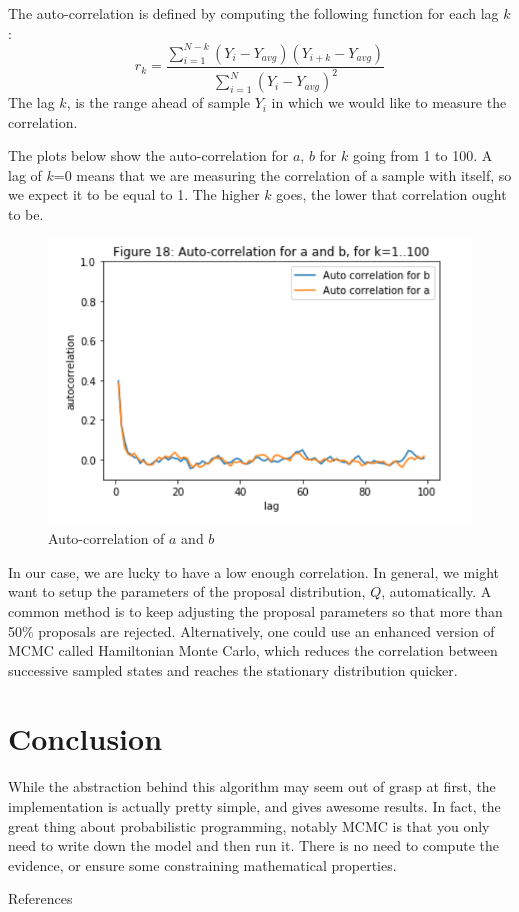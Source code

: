 The auto-correlation is defined by computing the following function for each lag $k$:
\begin{equation}r_{k}=\frac{\sum_{i=1}^{N-k}\left(Y_{i}-Y_{a v g}\right)\left(Y_{i+k}-Y_{a v g}\right)}{\sum_{i=1}^{N}\left(Y_{i}-Y_{a v g}\right)^{2}}\end{equation}
The lag $k$, is  the range ahead of sample  $Y_i$ in which we would like to measure the correlation.

The plots below show the auto-correlation for $a$, $b$ for $k$ going from 1 to 100. A lag of $k$=0 means that we are measuring the correlation of a sample with itself, so we expect it to be equal to 1. The higher $k$ goes, the lower that correlation ought to be.
\begin{figure}[h]
    \centering
\includegraphics[width=.8\textwidth]{pic/p05c09-snip16}
    \caption{Auto-correlation of $a$ and $b$}
    \label{fig:p05c09-snip16}
\end{figure}
In our case, we are lucky to have a low enough correlation. In general, we might want to setup the parameters of the proposal distribution, $Q$, automatically. A common method is to keep adjusting the proposal parameters so that more than 50\% proposals are rejected. Alternatively, one could use an enhanced version of MCMC called Hamiltonian Monte Carlo, which reduces the correlation between successive sampled states and reaches the stationary distribution quicker.

\section{Conclusion}
While the abstraction behind this algorithm may seem out of grasp at first, the implementation is actually pretty simple, and gives awesome results. In fact, the great thing about probabilistic programming, notably MCMC is that you only need to write down the model and then run it. There is no need to compute the evidence, or ensure some constraining mathematical properties.

References \cite{PeterDriscoll2006,CarsonChow2010,GirolamiRogers2017}

